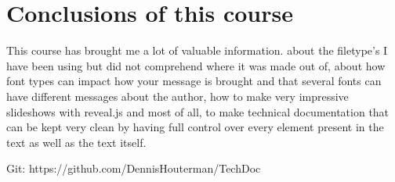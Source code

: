 \documentclass{article}
\begin{document}
\section{Conclusions of this course}
This course has brought me a lot of valuable information. about the filetype's I have been using but did not comprehend where it was made out of, about how font types can impact how your message is brought and that several fonts can have different messages about the author, how to make very impressive slideshows with reveal.js and most of all, to make technical documentation that can be kept very clean by having full control over every element present in the text as well as the text itself.

Git: https://github.com/DennisHouterman/TechDoc




\end{document}
